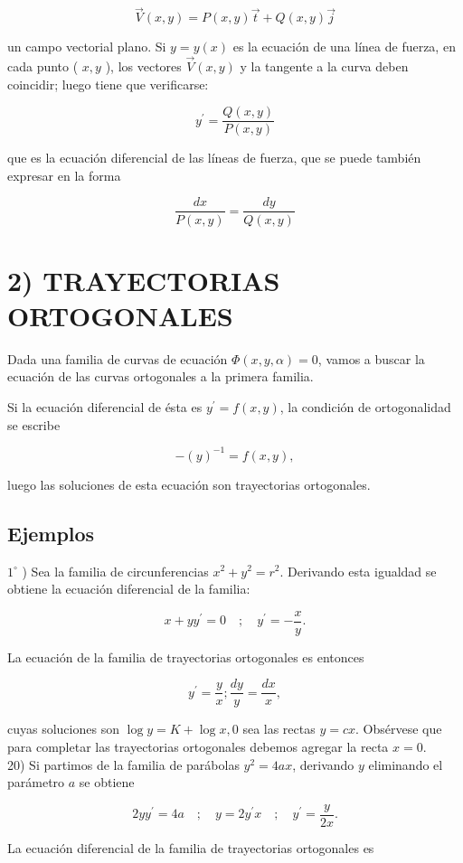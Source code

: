 \documentclass[10pt]{article}
\theoremstyle{plain}
\theoremstyle{definition}
\theoremstyle{remark}
\begin{document}
$$
\vec{V}(x, y)=P(x, y) \vec{t}+Q(x, y) \vec{j}
$$

un campo vectorial plano. Si $y=y(x)$ es la ecuación de una línea de fuerza, en cada punto ( $x, y$ ), los vectores $\vec{V}(x, y)$ y la tangente a la curva deben coincidir; luego tiene que verificarse:

$$
y^{\prime}=\frac{Q(x, y)}{P(x, y)}
$$

que es la ecuación diferencial de las líneas de fuerza, que se puede también expresar en la forma

$$
\frac{d x}{P(x, y)}=\frac{d y}{Q(x, y)}
$$


\section*{2) TRAYECTORIAS ORTOGONALES}
Dada una familia de curvas de ecuación $\Phi(x, y, \alpha)=0$, vamos a buscar la ecuación de las curvas ortogonales a la primera familia.

Si la ecuación diferencial de ésta es $y^{\prime}=f(x, y)$, la condición de ortogonalidad se escribe

$$
-(y)^{-1}=f(x, y),
$$

luego las soluciones de esta ecuación son trayectorias ortogonales.

\subsection{Ejemplos}
$1^{\circ}$ ) Sea la familia de circunferencias $x^{2}+y^{2}=r^{2}$. Derivando esta igualdad se obtiene la ecuación diferencial de la familia:

$$
x+y y^{\prime}=0 \quad ; \quad y^{\prime}=-\frac{x}{y} .
$$

La ecuación de la familia de trayectorias ortogonales es entonces

$$
y^{\prime}=\frac{y}{x} ; \frac{d y}{y}=\frac{d x}{x},
$$

cuyas soluciones son $\log y=K+\log x, 0$ sea las rectas $y=c x$. Obsérvese que para completar las trayectorias ortogonales debemos agregar la recta $x=0$.\\
20) Si partimos de la familia de parábolas $y^{2}=4 a x$, derivando $y$ eliminando el parámetro $a$ se obtiene

$$
2 y y^{\prime}=4 a \quad ; \quad y=2 y^{\prime} x \quad ; \quad y^{\prime}=\frac{y}{2 x} .
$$

La ecuación diferencial de la familia de trayectorias ortogonales es
\end{document}
